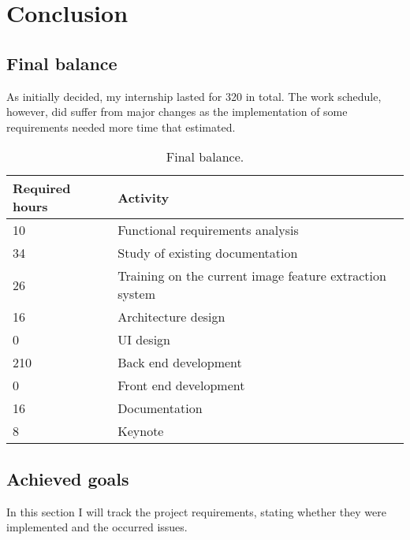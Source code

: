 
\chapter{Conclusion}
\label{cap:conclusion}

\section{Final balance}
As initially decided, my internship lasted for 320 in total. The work schedule, however, did suffer from major changes
as the implementation of some requirements needed more time that estimated.

\begin{center}
\begin{table}
\caption{Final balance.}
    \begin{tabular}{ | p{3cm} | p{9cm} |}
    \hline
    \textbf{Required hours} & \textbf{Activity} \\ \hline
    10 & Functional requirements analysis \\ \hline
    34 & Study of existing documentation \\ \hline
    26 & Training on the current image feature extraction system \\ \hline
    16 & Architecture design \\ \hline
    0 & UI design \\ \hline
    210 & Back end development \\ \hline
    0 & Front end development \\ \hline
		16 & Documentation \\ \hline
		8 & Keynote \\ \hline
   \end{tabular}
\end{table}
\end{center}



\section{Achieved goals}
In this section I will track the project requirements, stating whether they were implemented and the occurred issues.

